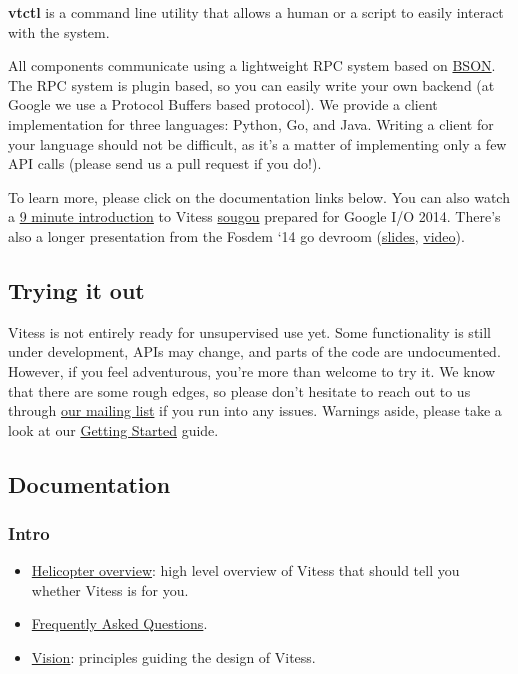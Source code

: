 \textbf{vtctl} is a command line utility that allows a human or a script to easily
interact with the system.

All components communicate using a lightweight RPC system based on
\href{http://bsonspec.org/}{BSON}. The RPC system is plugin based, so you can easily
write your own backend (at Google we use a Protocol Buffers based protocol). We
provide a client implementation for three languages: Python, Go, and Java.
Writing a client for your language should not be difficult, as it's a matter of
implementing only a few API calls (please send us a pull request if you do!).

To learn more, please click on the documentation links below.
You can also watch a \href{https://www.youtube.com/watch?v=midJ6b1LkA0}{9 minute introduction}
to Vitess \href{https://github.com/sougou}{sougou} prepared for Google I/O 2014.
There's also a longer presentation from the Fosdem `14 go devroom
(\href{https://github.com/youtube/vitess/blob/master/doc/Vitess2014.pdf?raw=true}{slides},
\href{http://youtu.be/qATTTSg6zXk}{video}).

\subsection{Trying it out}\hypertarget{trying-it-out}{}\label{trying-it-out}

Vitess is not entirely ready for unsupervised use yet. Some functionality is
still under development, APIs may change, and parts of the code are
undocumented. However, if you feel adventurous, you're more than welcome to try
it. We know that there are some rough edges, so please don't hesitate to reach out
to us through \href{https://groups.google.com/forum/\#!forum/vitess}{our mailing list}
if you run into any issues. Warnings aside, please take a look at our \href{https://github.com/youtube/vitess/blob/master/doc/GettingStarted.markdown}{Getting
Started}
guide.

\subsection{Documentation}\hypertarget{documentation}{}\label{documentation}

\subsubsection{Intro}\hypertarget{intro}{}\label{intro}

\begin{itemize}
\item \href{https://github.com/youtube/vitess/blob/master/doc/HelicopterOverview.markdown}{Helicopter overview}:
  high level overview of Vitess that should tell you whether Vitess is for you.
\item \href{https://github.com/youtube/vitess/blob/master/doc/FAQ.markdown}{Frequently Asked Questions}.
\item \href{https://github.com/youtube/vitess/blob/master/doc/Vision.markdown}{Vision}:
  principles guiding the design of Vitess.
\end{itemize}

